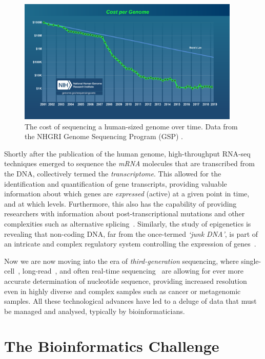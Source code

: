 \begin{justify}
\begin{figure}[h!]
    \centering
    \includegraphics[width=300pt]{chapters/images/introduction/sequencing_cost_moore.png}
    \caption{The cost of sequencing a human-sized genome over time. Data from the NHGRI Genome Sequencing Program (GSP) \cite{url-moore}.}\label{fig:seqcost}
\end{figure}

Shortly after the publication of the human genome, high-throughput RNA-seq techniques emerged to sequence the \emph{mRNA} molecules that are transcribed from the DNA, collectively termed the \emph{transcriptome}. This allowed for the identification and quantification of gene transcripts, providing valuable information about which genes are \emph{expressed} (active) at a given point in time, and at which levels. Furthermore, this also has the capability of providing researchers with information about post-transcriptional mutations and other complexities such as alternative splicing~\cite{wang2009rna}. Similarly, the study of epigenetics is revealing that non-coding DNA, far from the once-termed \textit{`junk DNA'}, is part of an intricate and complex regulatory system controlling the expression of genes~\cite{zuckerkandl2007combinatorial}.

Now we are now moving into the era of \emph{third-generation} sequencing, where single-cell~\cite{gawad2016single}, long-read~\cite{koren2015one}, and often real-time sequencing~\cite{flusberg2010direct} are allowing for ever more accurate determination of nucleotide sequence, providing increased resolution even in highly diverse and complex samples such as cancer or metagenomic samples. All these technological advances have led to a deluge of data that must be managed and analysed, typically by bioinformaticians.


\section{The Bioinformatics Challenge}


\end{justify}
